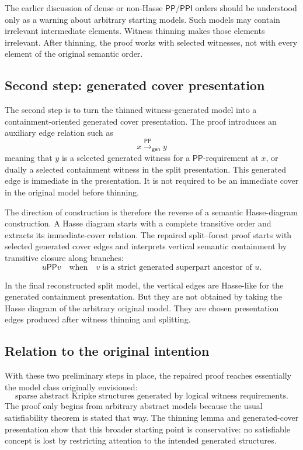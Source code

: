 \documentclass[11pt]{article}
\newcommand{\PP}{\mathsf{PP}}
\newcommand{\PPI}{\mathsf{PPI}}
\newcommand{\gen}{\mathsf{gen}}
\theoremstyle{definition}
\theoremstyle{plain}
\begin{document}
The earlier discussion of dense or non-Hasse $\PP/\PPI$ orders should be understood only as a warning about arbitrary starting models.  Such models may contain irrelevant intermediate elements.  Witness thinning makes those elements irrelevant.  After thinning, the proof works with selected witnesses, not with every element of the original semantic order.

\subsection{Second step: generated cover presentation}

The second step is to turn the thinned witness-generated model into a containment-oriented generated cover presentation.  The proof introduces an auxiliary edge relation such as
\[
x \xrightarrow{\PP}_{\gen} y
\]
meaning that $y$ is a selected generated witness for a $\PP$-requirement at $x$, or dually a selected containment witness in the split presentation.  This generated edge is immediate in the presentation.  It is not required to be an immediate cover in the original model before thinning.

The direction of construction is therefore the reverse of a semantic Hasse-diagram construction.  A Hasse diagram starts with a complete transitive order and extracts its immediate-cover relation.  The repaired split--forest proof starts with selected generated cover edges and interprets vertical semantic containment by transitive closure along branches:
\[
u\PP v
\quad\text{when}\quad
v \text{ is a strict generated superpart ancestor of }u.
\]

In the final reconstructed split model, the vertical edges are Hasse-like for the generated containment presentation.  But they are not obtained by taking the Hasse diagram of the arbitrary original model.  They are chosen presentation edges produced after witness thinning and splitting.

\subsection{Relation to the original intention}

With these two preliminary steps in place, the repaired proof reaches essentially the model class originally envisioned:
\[
\text{sparse abstract Kripke structures generated by logical witness requirements.}
\]
The proof only begins from arbitrary abstract models because the usual satisfiability theorem is stated that way.  The thinning lemma and generated-cover presentation show that this broader starting point is conservative: no satisfiable concept is lost by restricting attention to the intended generated structures.
\end{document}
